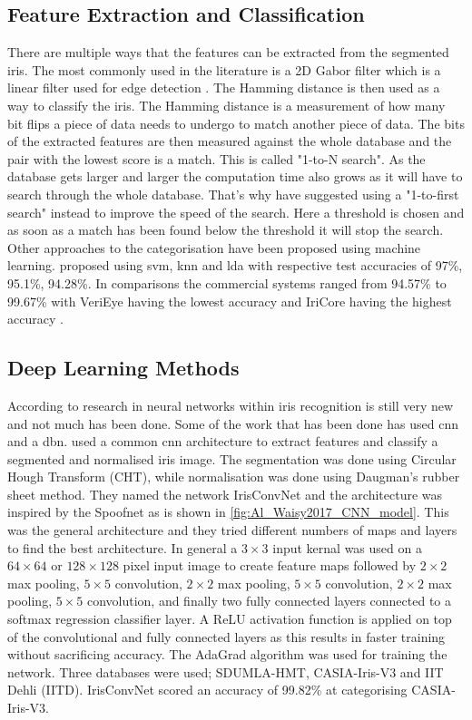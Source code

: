 \subsection{Feature Extraction and Classification}
There are multiple ways that the features can be extracted from the segmented iris. The most commonly used in the literature is a 2D Gabor filter which is a linear filter used for edge detection \citep{Daugman1993}. The Hamming distance is then used as a way to classify the iris. The Hamming distance is a measurement of how many bit flips a piece of data needs to undergo to match another piece of data. The bits of the extracted features are then measured against the whole database and the pair with the lowest score is a match. This is called "1-to-N search". As the database gets larger and larger the computation time also grows as it will have to search through the whole database. That's why \cite{Kuehlkamp2016} have suggested using a "1-to-first search" instead to improve the speed of the search. Here a threshold is chosen and as soon as a match has been found below the threshold it will stop the search. Other approaches to the categorisation have been proposed using machine learning. \cite{Khan2017a} proposed using \gls{svm}, \gls{knn} and \gls{lda} with respective test accuracies of 97\%, 95.1\%, 94.28\%. In comparisons the  commercial systems ranged from 94.57\% to  99.67\% with VeriEye having the lowest accuracy and IriCore having the highest accuracy \citep{Khan2017a} . 

\subsection{Deep Learning Methods}
According to \cite{Zhao2017a} research in neural networks within iris recognition is still very new and not much has been done. Some of the work that has been done has used \gls{cnn} and a \gls{dbn}. \cite{Al-Waisy2017} used a common \gls{cnn} architecture to extract features and classify a segmented and normalised iris image. The segmentation was done using Circular Hough Transform (CHT), while normalisation was done using Daugman's rubber sheet method. They named the network IrisConvNet and the architecture was inspired by the Spoofnet as is shown in \autoref{fig:Al_Waisy2017_CNN_model}. This was the general architecture and they tried different numbers of maps and layers to find the best architecture. In general a $3\times3$ input kernal was used on a $64\times64$ or $128\times128$ pixel input image to create feature maps followed by $2\times2$ max pooling, $5\times5$ convolution, $2\times2$ max pooling, $5\times5$ convolution, $2\times2$ max pooling, $5\times5$ convolution, and finally two fully connected layers connected to a softmax regression classifier layer. A ReLU activation function is applied on top of the convolutional and fully connected layers as this results in faster training without sacrificing accuracy. The AdaGrad algorithm was used for training the network. Three databases were used; SDUMLA-HMT, CASIA-Iris-V3 and IIT Dehli (IITD). IrisConvNet scored an accuracy of 99.82\% at categorising CASIA-Iris-V3. 

